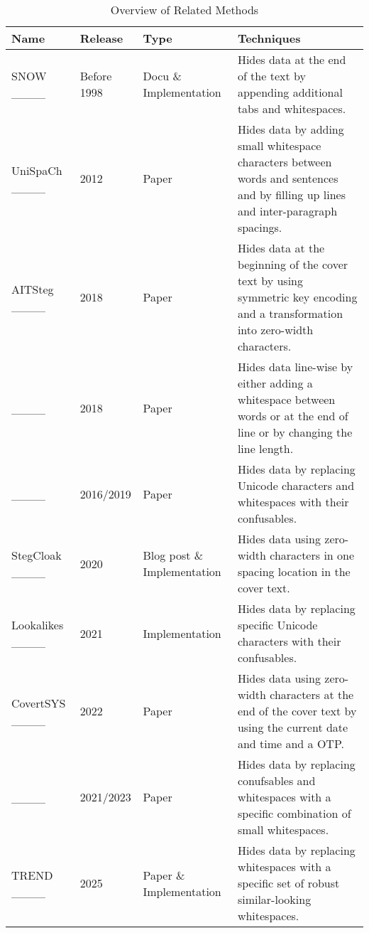 	\begin{table}[!htb]
		\centering
		\caption{Overview of Related Methods}
		\label{tab:related-methods}
		\begin{tabular}{p{3.5cm} p{1.8cm} p{2.5cm} p{7cm}}
			\toprule
			Name & Release & Type & Techniques \\
			\midrule
			SNOW ____ & Before 1998 & Docu \& Im\-ple\-ment\-ation & Hides data at the end of the text by appending additional tabs and whitespaces.\\
			UniSpaCh ____ & 2012 & Paper & Hides data by adding small whitespace characters between words and sentences and by filling up lines and inter-paragraph spacings.\\
			AITSteg ____ & 2018 & Paper & Hides data at the beginning of the cover text by using symmetric key encoding and a transformation into zero-width characters.\\
			____ & 2018 & Paper & Hides data line-wise by either adding a whitespace between words or at the end of line or by changing the line length.\\
			____ & 2016/2019 & Paper & Hides data by replacing Unicode characters and whitespaces with their confusables.\\
			StegCloak ____ & 2020 & Blog post \& Im\-ple\-ment\-ation & Hides data using zero-width characters in one spacing location in the cover text.\\
			Lookalikes ____ & 2021 & Im\-ple\-ment\-ation & Hides data by replacing specific Unicode characters with their confusables.\\
			CovertSYS ____ & 2022 & Paper & Hides data using zero-width characters at the end of the cover text by using the current date and time and a \ac{OTP}.\\
			____ & 2021/2023 & Paper & Hides data by replacing conufsables and whitespaces with a specific combination of small whitespaces.\\
			\ac{TREND} ____ & 2025 & Paper \& Im\-ple\-ment\-ation & Hides data by replacing whitespaces with a specific set of robust similar-looking whitespaces.\\
			\bottomrule
		\end{tabular}
	\end{table}
	
	\FloatBarrier